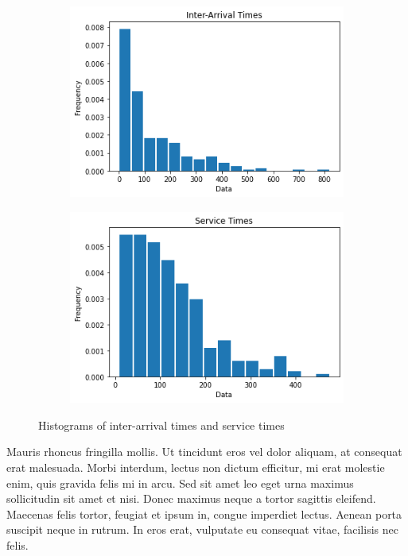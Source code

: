\documentclass{article}
\begin{document}
\begin{figure}[h]
    \centering
    \begin{subfigure}[b]{0.45\textwidth}
        \centering
        \includegraphics[width=\textwidth]{fig1.png}
        \caption{}
        \label{fig:img1}
    \end{subfigure}
    \hfill
    \begin{subfigure}[b]{0.45\textwidth}
        \centering
        \includegraphics[width=\textwidth]{fig2.png}
        \caption{}
        \label{fig:img2}
    \end{subfigure}

    \caption{Histograms of inter-arrival times and service times}
    \label{fig:two-figs}
\end{figure}

Mauris rhoncus fringilla mollis. Ut tincidunt eros vel dolor aliquam, at consequat erat malesuada. Morbi interdum, lectus non dictum efficitur, mi erat molestie enim, quis gravida felis mi in arcu. Sed sit amet leo eget urna maximus sollicitudin sit amet et nisi. Donec maximus neque a tortor sagittis eleifend. Maecenas felis tortor, feugiat et ipsum in, congue imperdiet lectus. Aenean porta suscipit neque in rutrum. In eros erat, vulputate eu consequat vitae, facilisis nec felis.
\end{document}

